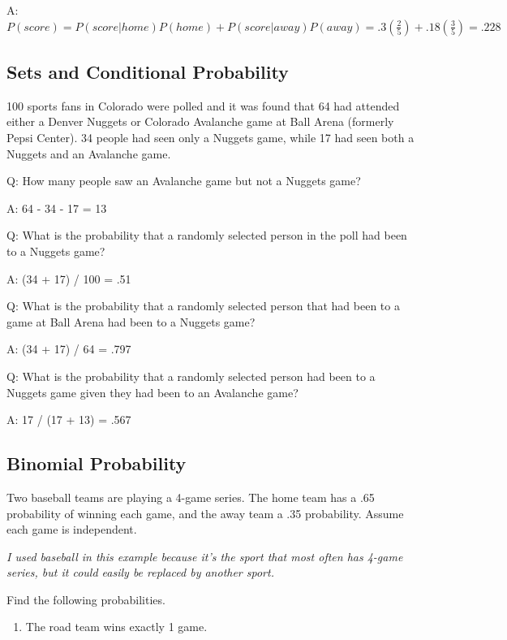 \documentclass[
]{book}
\providecommand{\tightlist}{%
  \setlength{\itemsep}{0pt}\setlength{\parskip}{0pt}}
\theoremstyle{definition}
\theoremstyle{definition}
\theoremstyle{definition}
\theoremstyle{definition}
\theoremstyle{remark}
\begin{document}
A: \(P(score) = P(score|home)P(home) + P(score|away)P(away) = .3(\frac{2}{5}) + .18(\frac{3}{5}) = .228\)

\hypertarget{sets-and-conditional-probability-1}{%
\subsection{Sets and Conditional Probability}\label{sets-and-conditional-probability-1}}

100 sports fans in Colorado were polled and it was found that 64 had attended either a Denver Nuggets or Colorado Avalanche game at Ball Arena (formerly Pepsi Center). 34 people had seen only a Nuggets game, while 17 had seen both a Nuggets and an Avalanche game.

Q: How many people saw an Avalanche game but not a Nuggets game?

A: 64 - 34 - 17 = 13

Q: What is the probability that a randomly selected person in the poll had been to a Nuggets game?

A: (34 + 17) / 100 = .51

Q: What is the probability that a randomly selected person that had been to a game at Ball Arena had been to a Nuggets game?

A: (34 + 17) / 64 = .797

Q: What is the probability that a randomly selected person had been to a Nuggets game given they had been to an Avalanche game?

A: 17 / (17 + 13) = .567

\hypertarget{binomial-probability-1}{%
\subsection{Binomial Probability}\label{binomial-probability-1}}

Two baseball teams are playing a 4-game series. The home team has a .65 probability of winning each game, and the away team a .35 probability. Assume each game is independent.

\emph{I used baseball in this example because it's the sport that most often has 4-game series, but it could easily be replaced by another sport.}

Find the following probabilities.

\begin{enumerate}
\def\labelenumi{(\alph{enumi})}
\tightlist
\item
  The road team wins exactly 1 game.
\end{enumerate}
\end{document}
